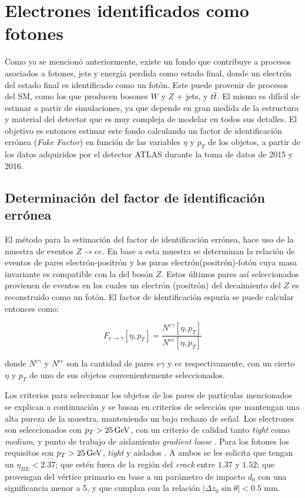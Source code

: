 \chapter{Electrones identificados como fotones}\label{ch:e_fake}


Como ya se mencionó anteriormente, existe un fondo que contribuye a procesos asociados a fotones, jets y energía perdida como estado final, donde un electrón del estado final es identificado como un fotón. Este puede provenir de procesos del SM, como los que producen bosones $W$ y $Z$ + jets, y $t \overline{t}$. El mismo es difícil de estimar a partir de simulaciones, ya que depende en gran medida de la estructura y material del detector que es muy compleja de modelar en todos sus detalles. El objetivo es entonces estimar este fondo calculando un factor de identificación errónea (\textit{Fake Factor}) en función de las variables $\eta$ y $p_{T}$ de los objetos, a partir de los datos adquiridos por el detector ATLAS durante la toma de datos de 2015 y 2016.

\section{Determinación del factor de identificación errónea}

El método para la estimación del factor de identificación errónea, hace uso de la muestra de eventos $Z\rightarrow ee$. En base a esta muestra se determinan la relación de eventos de pares electrón-positrón y los paras electrón(positrón)-fotón cuya masa invariante es compatible con la del bosón $Z$. Estos últimos pares así seleccionados provienen de eventos en los cuales un electrón (positrón) del decaimiento del $Z$ es reconstruido como un fotón. El factor de identificación espuria se puede calcular entonces como: 

\begin{equation}
F_{e\rightarrow\gamma}[\eta , p_{T}]=\frac{N^{e\gamma}[\eta , p_{T}]}{N^{ee}[\eta , p_{T}]} \label{eq:ff_ratio}
\end{equation}

\noindent
donde $N^{e\gamma}$ y $N^{ee}$ son la cantidad de pares $e\gamma$ y $ee$ respectivamente, con un cierto $\eta$ y $p_{T}$ de uno de sus objetos convenientemente seleccionados.

Los criterios para seleccionar los objetos de los pares de partículas mencionados se explican a continuación y se basan en criterios de selección que mantengan una alta pureza de la muestra, manteniendo un bajo rechazo de señal.
Los electrones  son seleccionados con $p_{T} > 25 \, \mathrm{GeV}$, con un criterio de calidad tanto \textit{tight} como \textit{medium}, y punto de trabajo de aislamiento \textit{gradient loose} \cite{ATLAS-CONF-2016-024}. Para los fotones los requisitos son $p_{T} > 25 \, \mathrm{GeV}$, \textit{tight} y aislados \cite{STDM-2010-08}. A ambos se les solicita que tengan un $\eta_{BE}<2.37$; que estén fuera de la región del \textit{crack} entre $1.37$ y $1.52$; que provengan del vértice primario en base a un parámetro de impacto $d_{0}$ con una significancia menor a 5, y que cumplan con la relación $|\Delta z_{0}\sin\theta|<0.5$ mm.

